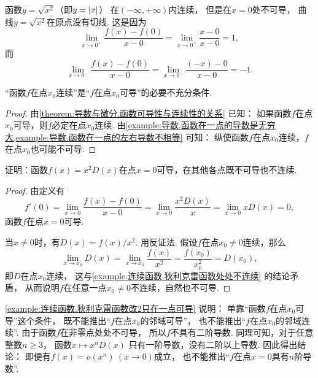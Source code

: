 \begin{example}\label{example:导数.函数在一点的左右导数不相等}
函数\(y=\sqrt{x^2}\)（即\(y=\abs{x}\)）
在\((-\infty,+\infty)\)内连续，
但是在\(x=0\)处不可导，
曲线\(y=\sqrt{x^2}\)在原点没有切线.
这是因为\[
	\lim_{x\to0^+} \frac{f(x)-f(0)}{x-0}
	= \lim_{x\to0^+} \frac{x-0}{x-0}
	= 1,
\]
而\[
	\lim_{x\to0^-} \frac{f(x)-f(0)}{x-0}
	= \lim_{x\to0^-} \frac{(-x)-0}{x-0}
	= -1.
\]
\end{example}

\begin{theorem}
“函数\(f\)在点\(x_0\)连续”是“\(f\)在点\(x_0\)可导”的必要不充分条件.
\begin{proof}
由\cref{theorem:导数与微分.函数可导性与连续性的关系} 已知：
如果函数\(f\)在点\(x_0\)可导，则\(f\)必定在点\(x_0\)连续.
由\cref{example:导数.函数在一点的导数是无穷大,example:导数.函数在一点的左右导数不相等} 可知：
纵使函数\(f\)在点\(x_0\)连续，\(f\)在点\(x_0\)也可能不可导.
\end{proof}
\end{theorem}

\begin{example}\label{example:连续函数.狄利克雷函数改2只在一点可导}
证明：函数\(f(x) = x^2 D(x)\)在点\(x=0\)可导，在其他各点既不可导也不连续.
\begin{proof}
由定义有\[
	f'(0) = \lim_{x\to0} \frac{f(x) - f(0)}{x - 0}
	= \lim_{x\to0} \frac{x^2 D(x)}{x}
	= \lim_{x\to0} x D(x)
	= 0,%
\]
函数\(f\)在点\(x=0\)可导.

当\(x\neq0\)时，有\(D(x) = f(x) / x^2\).
用反证法.
假设\(f\)在点\(x_0\neq0\)连续，那么\[
	\lim_{x \to x_0} D(x)
	= \lim_{x \to x_0} \frac{f(x)}{x^2}
	= \frac{f(x_0)}{x_0^2}
	= D(x_0),
\]
即\(D\)在点\(x_0\)连续，
这与\cref{example:连续函数.狄利克雷函数处处不连续} 的结论矛盾，
从而说明\(f\)在任意一点\(x_0\neq0\)不连续，自然也不可导.
\end{proof}
\end{example}
\begin{remark}
\cref{example:连续函数.狄利克雷函数改2只在一点可导} 说明：
单靠“函数\(f\)在点\(x_0\)可导”这个条件，
既不能推出“\(f\)在点\(x_0\)的邻域可导”，
也不能推出“\(f\)在点\(x_0\)的邻域连续”.
由于函数\(f\)在非零点处处不可导，
所以\(f\)不具有二阶导数.
同理可知，对于任意整数\(n\geq3\)，
函数\(x \mapsto x^n D(x)\)
只有一阶导数，没有二阶以上导数.
因此得出结论：
即便有\(f(x) = o(x^n)\ (x\to0)\)成立，
也不能推出“\(f\)在点\(x=0\)具有\(n\)阶导数”.
\end{remark}

